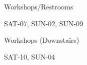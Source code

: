 \documentclass{article}
\newcommand{\room}[1]{
    \noindent
    #1
    \vspace{.2in}

}
\begin{document}
\rssheader[2in]
\vfill

\fontsize{36pt}{40pt}
\selectfont

\rssarrowleft[1in]

\begin{center}
\room{Workshops/Restrooms}
\fontsize{18pt}{24pt}
\selectfont
\room{SAT-07, SUN-02, SUN-09}
\end{center}

\vfill

\fontsize{36pt}{40pt}
\selectfont

\begin{minipage}{\textwidth}
    \begin{minipage}{.7\textwidth}
        \begin{center}
            \room{Workshops (Downstairs)}
\fontsize{18pt}{24pt} \selectfont
            \room{SAT-10, SUN-04}
        \end{center}
    \end{minipage}
    \hfill
    \begin{minipage}{.25\textwidth}
        \begin{center}
            \rssarrowdown[1in]
        \end{center}
    \end{minipage}
\end{minipage}
\end{document}

